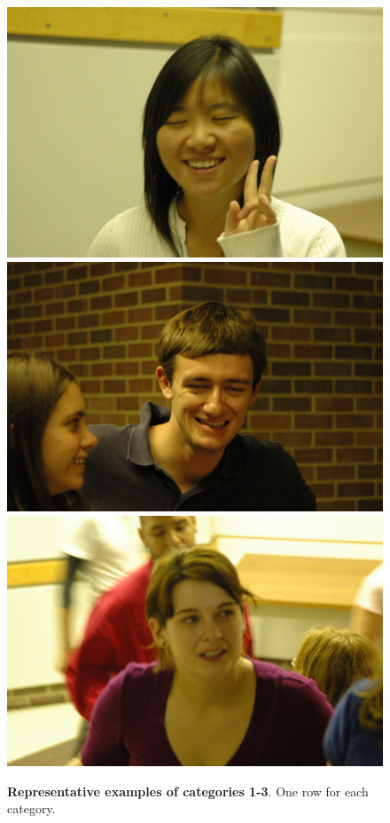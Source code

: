 \begin{figure}
 \caption{{\bf Representative examples of categories 1-3}. One row for each category.\vspace{0mm}}\label{fig:examples1-3}
\centering
\includegraphics[scale=0.35,clip=true]{figures_cvpr/examples/4/success/DSC_1579.jpg} 
\includegraphics[scale=0.35,clip=true]{figures_cvpr/examples/4/success/DSC_1839.jpg} 
\includegraphics[scale=0.35,clip=true]{figures_cvpr/examples/4/success/DSC_1883.jpg} 

\end{figure}
